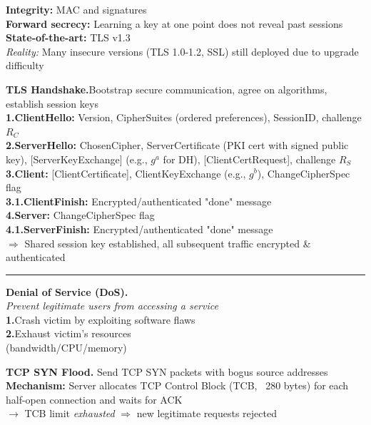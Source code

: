 \documentclass[9pt, a4paper]{extarticle}
\makeatletter
\renewcommand{\hline}{\noalign{\vskip 2px}\hrule\@height\arrayrulewidth\@width\linewidth\noalign{\vskip 2px}}
\makeatother
\begin{document}
\begin{minipage}[t]{0.495\textwidth}
\begin{minipage}[t]{0.36\textwidth}
		\textbf{Integrity:} MAC and signatures\\
		\textbf{Forward secrecy:} Learning a key at one point does not reveal past sessions\\
		\textbf{State-of-the-art:} TLS v1.3\\
		\textit{Reality:} Many insecure versions (TLS 1.0-1.2, SSL) still deployed due to upgrade difficulty
	\end{minipage}\hfill\vline\hfill
	\begin{minipage}[t]{0.62\textwidth}
		\textbf{TLS Handshake.}Bootstrap secure communication, agree on algorithms, establish session keys\\
		\textbf{1.ClientHello:} Version, CipherSuites (ordered preferences), SessionID, challenge $R_C$\\
		\textbf{2.ServerHello:} ChosenCipher, ServerCertificate (PKI cert with signed public key), [ServerKeyExchange] (e.g., $g^a$ for DH), [ClientCertRequest], challenge $R_S$\\
		\textbf{3.Client:} [ClientCertificate], ClientKeyExchange (e.g., $g^b$), ChangeCipherSpec flag\\
		\textbf{3.1.ClientFinish:} Encrypted/authenticated "done" message\\
		\textbf{4.Server:} ChangeCipherSpec flag\\
		\textbf{4.1.ServerFinish: }Encrypted/authenticated "done" message\\
		$\Rightarrow$ Shared session key established, all subsequent traffic encrypted \& authenticated
	\end{minipage}\hline
	\begin{minipage}[t]{0.31\textwidth}
		\textbf{Denial of Service (DoS).} \\
		\textit{Prevent legitimate users from accessing a service}\\
		\textbf{1.}Crash victim by exploiting software flaws\\
		\textbf{2.}Exhaust victim's resources \\(bandwidth/CPU/memory)
	\end{minipage}\hfill\vline\hfill
	\begin{minipage}[t]{0.68\textwidth}
		\textbf{TCP SYN Flood.} Send TCP SYN packets with bogus source addresses\\
		\textbf{Mechanism:} Server allocates TCP Control Block (TCB, ~280 bytes) for each half-open connection and waits for ACK\\
		$\rightarrow$ TCB limit \textit{exhausted} $\Rightarrow$ new legitimate requests rejected\\

\end{minipage}
\end{minipage}
\end{document}
